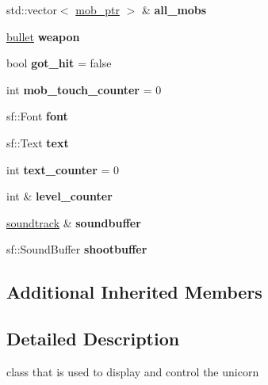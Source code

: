 \begin{DoxyCompactItemize}
\mbox{\label{classunicorn_aac73bd105ef4ee4c7d46727a7e832bcf}} 
std\+::vector$<$ \hyperlink{typedefs_8hpp_a09ee7f853fc9bc830a9445a06fd53d4b}{mob\+\_\+ptr} $>$ \& {\bfseries all\+\_\+mobs}
\item 
\mbox{\label{classunicorn_a3e51a9e196533b27304f21eb26d8f4ba}} 
\hyperlink{classbullet}{bullet} {\bfseries weapon}
\item 
\mbox{\label{classunicorn_ab808840ba1e83cb34c691ba2472d6f9b}} 
bool {\bfseries got\+\_\+hit} = false
\item 
\mbox{\label{classunicorn_ac0762399be7cd26263456d86fd2774ff}} 
int {\bfseries mob\+\_\+touch\+\_\+counter} = 0
\item 
\mbox{\label{classunicorn_ac4e77e1b0fa4f0812cce288f5d90897b}} 
sf\+::\+Font {\bfseries font}
\item 
\mbox{\label{classunicorn_a141d43a06ed4ba77c0aa891e0cf01b73}} 
sf\+::\+Text {\bfseries text}
\item 
\mbox{\label{classunicorn_a7e53b65e44f4909ecedda128161673b6}} 
int {\bfseries text\+\_\+counter} = 0
\item 
\mbox{\label{classunicorn_a4b92a71eb730de05a72d7963bfe13254}} 
int \& {\bfseries level\+\_\+counter}
\item 
\mbox{\label{classunicorn_a1aa49dd70ca2165a228c02d63e6d3217}} 
\hyperlink{classsoundtrack}{soundtrack} \& {\bfseries soundbuffer}
\item 
\mbox{\label{classunicorn_ae1f8f06df0010b0d469c3e56bb67c301}} 
sf\+::\+Sound\+Buffer {\bfseries shootbuffer}
\end{DoxyCompactItemize}
\subsection*{Additional Inherited Members}


\subsection{Detailed Description}
class that is used to display and control the unicorn 

